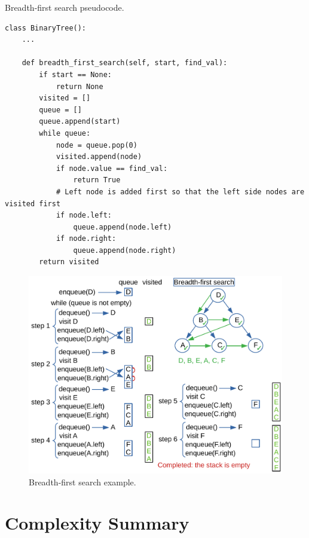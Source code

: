 \begin{algorithm}[H]
	\DontPrintSemicolon
	\LinesNumbered
\caption{Breadth-first search pseudocode.}
\end{algorithm}

\begin{lstlisting}[firstnumber=1, caption={Breadth-first search implementation.}]
class BinaryTree():
	...

	def breadth_first_search(self, start, find_val):
		if start == None:
			return None
		visited = []
		queue = []
		queue.append(start)
		while queue:
			node = queue.pop(0)
			visited.append(node)
			if node.value == find_val:
				return True
			# Left node is added first so that the left side nodes are visited first
			if node.left:
				queue.append(node.left)
			if node.right:
				queue.append(node.right)
		return visited
\end{lstlisting}

\begin{figure}[H]
	\begin{center}
		\includegraphics[scale=.6]{chapters/appendix/images/appendixtree/treesappendix_4.pdf}
		\caption[Breadth-first search example.]{Breadth-first search example.}
		\label{appendixtrees_3}
	\end{center}
\end{figure}

\section{Complexity Summary}